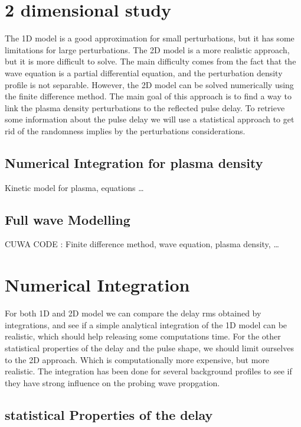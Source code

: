 \documentclass[11pt,a4paper]{report}
\begin{document}
\begin{multicols}{2}

    \section{2 dimensional study}
    The 1D model is a good approximation for small perturbations, but it has some limitations for large perturbations. The 2D model is a more realistic approach, but it is more difficult to solve. The main difficulty comes from the fact that the wave equation is a partial differential equation, and the perturbation density profile is not separable. However, the 2D model can be solved numerically using the finite difference method. The main goal of this approach is to find a way to link the plasma density perturbations to the reflected pulse delay. To retrieve some information about the pulse delay we will use a statistical approach to get rid of the randomness implies by the perturbations considerations.
    \subsection{Numerical Integration for plasma density}
    Kinetic model for plasma, equations \dots
    \subsection{Full wave Modelling}
    CUWA CODE : Finite difference method, wave equation, plasma density, \dots
    \section{Numerical Integration}
    For both 1D and 2D model we can compare the delay rms obtained by integrations, and see if a simple analytical integration of the 1D model can be realistic, which should help releasing some computations time. For the other statistical properties of the delay and the pulse shape, we should limit ourselves to the 2D approach.
    Which is computationally more expensive, but more realistic. The integration has been done for several background profiles to see if they have strong influence on the probing wave propgation.
    \subsection{statistical Properties of the delay}

\end{multicols}
\end{document}
